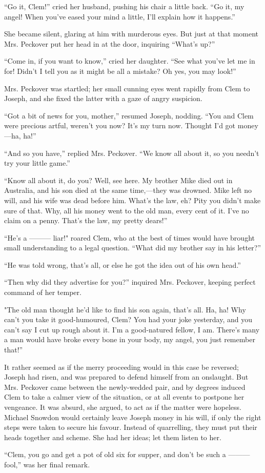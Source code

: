 ``Go it, Clem!'' cried her husband, pushing his chair a little back.
``Go it, my angel! When you've eased your mind a little, I'll explain
how it happens.''

She became silent, glaring at him with murderous eyes. But just at that
moment Mrs. Peckover put her head in at the door, inquiring ``What's
up?''

``Come in, if you want to know,'' cried her daughter. ``See what you've
let me in for! Didn't I tell you as it might be all a mistake? Oh yes,
you may look!''

Mrs. Peckover was startled; her small cunning eyes went rapidly from
Clem to Joseph, and she fixed the latter with a gaze of angry suspicion.

``Got a bit of news for you, mother,'' resumed Joseph, nodding. ``You
and Clem were precious artful, weren't you now? It's {}my turn now.
Thought I'd got money---ha, ha!''

``And so you have,'' replied Mrs. Peckover. ``We know all about it, so
you needn't try your little game.''

``Know all about it, do you? Well, see here. My brother Mike died out in
Australia, and his son died at the same time,---they was drowned. Mike
left no will, and his wife was dead before him. What's the law, eh? Pity
you didn't make sure of that. Why, all his money went to the old man,
every cent of it. I've no claim on a penny. That's the law, my pretty
dears!''

``He's a {{---------}} liar!" roared Clem, who at the best of times
would have brought small understanding to a legal question. ``What did
my brother say in his letter?''

``He was told wrong, that's all, or else he got the idea out of his own
head.''

``Then why did they advertise for you?'' inquired Mrs. Peckover, keeping
perfect command of her temper.

"The old man thought he'd like to find {}his son again, that's all. Ha,
ha! Why can't you take it good-humoured, Clem? You had your joke
yesterday, and you can't say I cut up rough about it. I'm a good-natured
fellow, I am. There's many a man would have broke every bone in your
body, my angel, you just remember that!''

It rather seemed as if the merry proceeding would in this case be
reversed; Joseph had risen, and was prepared to defend himself from an
onslaught. But Mrs. Peckover came between the newly-wedded pair, and by
degrees induced Clem to take a calmer view of the situation, or at all
events to postpone her vengeance. It was absurd, she argued, to act as
if the matter were hopeless. Michael Snowdon would certainly leave
Joseph money in his will, if only the right steps were taken to secure
his favour. Instead of quarrelling, they must put their heads together
and scheme. She had her ideas; let them listen to her.

``Clem, you go and get a pot of old six for supper, and don't be such a
{{---------}} fool,'' was her final remark.
